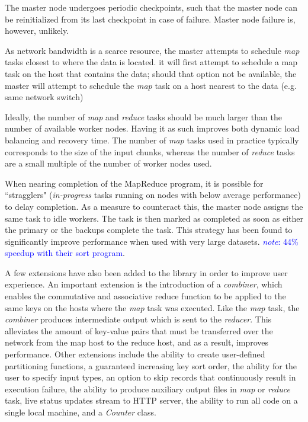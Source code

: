 \documentclass{report}
\newcommand{\note}[1]{\textcolor{blue}{\textit{note}: #1}}
\begin{document}
        The master node undergoes periodic checkpoints, such that the master
        node can be reinitialized from its last checkpoint in case of failure.
        Master node failure is, however, unlikely.

        As network bandwidth is a scarce resource, the master attempts to
        schedule \textit{map} tasks closest to where the data is located. it
        will first attempt to schedule a map task on the host that contains the
        data; should that option not be available, the master will attempt to
        schedule the \textit{map} task on a host nearest to the data (e.g. same
        network switch)

        Ideally, the number of \textit{map} and \textit{reduce} tasks should be
        much larger than the number of available worker nodes.  Having it as
        such improves both dynamic load balancing and recovery time. The number
        of \textit{map} tasks used in practice typically corresponds to the size
        of the input chunks, whereas the number of \textit{reduce} tasks are a
        small multiple of the number of worker nodes used.

        When nearing completion of the MapReduce program, it is possible for
        ``stragglers" (\textit{in-progress} tasks running on nodes with below
        average performance) to delay completion. As a measure to counteract
        this, the master node assigns the same task to idle workers. The task is
        then marked as completed as soon as either the primary or the backups
        complete the task. This strategy has been found to significantly improve
        performance when used with very large datasets.  \note{44\% speedup with
        their sort program}.

        A few extensions have also been added to the library in order to improve
        user experience. An important extension is the introduction of a
        \textit{combiner}, which enables the commutative and associative reduce
        function to be applied to the same keys on the hosts where the
        \textit{map} task was executed. Like the \textit{map} task, the
        \textit{combiner} produces intermediate output which is sent to the
        \textit{reducer}. This alleviates the amount of key-value pairs that
        must be transferred over the network from the map host to the reduce
        host, and as a result, improves performance. Other extensions include
        the ability to create user-defined partitioning functions, a guaranteed
        increasing key sort order, the ability for the user to specify input
        types, an option to skip records that continuously result in execution
        failure, the ability to produce auxiliary output files in \textit{map}
        or \textit{reduce} task, live status updates stream to HTTP server, the
        ability to run all code on a single local machine, and a
        \textit{Counter} class.  
\end{document}
